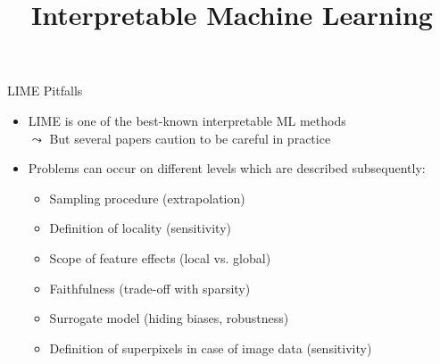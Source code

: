 \documentclass[11pt,compress,t,notes=noshow, aspectratio=169, xcolor=table]{beamer}
\title{Interpretable Machine Learning}
\date{}
\begin{document}
	
	
	
	
	
	\newcommand{\titlefigure}{figure/lime5}
    \newcommand{\learninggoals}{
    	\item Learn why LIME should be used with caution
    	\item Possible pitfalls of LIME}
	
	
	


\begin{frame}[c]{LIME Pitfalls}
  \begin{itemize}
  	\item %
  	LIME is one of the best-known interpretable ML methods\\ 
  	$\leadsto$ But several papers caution to be careful in practice 
  	\item Problems can occur on different levels which are described subsequently: 
  	\begin{itemize}
  	    \item Sampling procedure (extrapolation)
  	    \item Definition of locality (sensitivity)
  	    \item Scope of feature effects (local vs. global)
  	    \item Faithfulness (trade-off with sparsity)
  	    \item Surrogate model (hiding biases, robustness)
  	    \item Definition of superpixels in case of image data (sensitivity)
  	\end{itemize}
  \end{itemize}
  
\end{frame}
  
\end{document}
